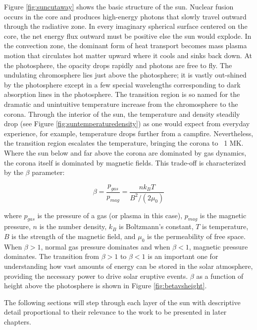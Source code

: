 Figure \ref{fig:suncutaway} shows the basic structure of the sun. Nuclear fusion occurs in the core and produces high-energy photons that slowly travel outward through the radiative zone. In every imaginary spherical surface centered on the core, the net energy flux outward must be positive else the sun would explode. In the convection zone, the dominant form of heat transport becomes mass plasma motion that circulates hot matter upward where it cools and sinks back down. At the photosphere, the opacity drops rapidly and photons are free to fly. The undulating chromosphere lies just above the photosphere; it is vastly out-shined by the photosphere except in a few special wavelengths corresponding to dark absorption lines in the photosphere. The transition region is so named for the dramatic and unintuitive temperature increase from the chromosphere to the corona. Through the interior of the sun, the temperature and density steadily drop (see Figure \ref{fig:suntemperaturedensity}) as one would expect from everyday experience, for example, temperature drops further from a campfire. Nevertheless, the transition region escalates the temperature, bringing the corona to ~1 MK. Where the sun below and far above the corona are dominated by gas dynamics, the corona itself is dominated by magnetic fields. This trade-off is characterized by the $\beta$ parameter:

\begin{equation}
    \label{eq:beta}
    \beta = \frac{p_{gas}}{p_{mag}} = \frac{nk_BT}{B^2/(2\mu_0)}
\end{equation}

\noindent where $p_{gas}$ is the pressure of a gas (or plasma in this case), $p_{mag}$ is the magnetic pressure, $n$ is the number density, $k_B$ is Boltzmann's constant, $T$ is temperature, $B$ is the strength of the magnetic field, and $\mu_0$ is the permeability of free space. When $\beta > 1$, normal gas pressure dominates and when $\beta < 1$, magnetic pressure dominates. The transition from $\beta > 1$ to $\beta < 1$ is an important one for understanding how vast amounts of energy can be stored in the solar atmosphere, providing the necessary power to drive solar eruptive events. $\beta$ as a function of height above the photosphere is shown in Figure \ref{fig:betavsheight}. 

The following sections will step through each layer of the sun with descriptive detail proportional to their relevance to the work to be presented in later chapters. 

